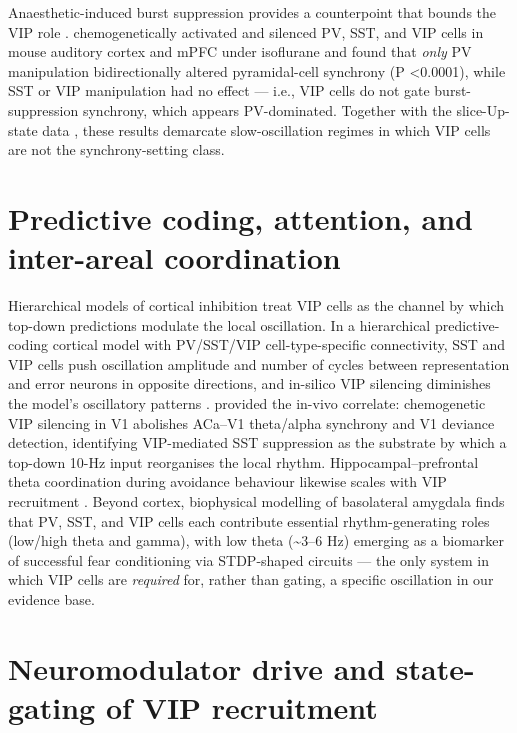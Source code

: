 \documentclass[11pt]{article}
\begin{document}
Anaesthetic-induced burst suppression provides a counterpoint that bounds the VIP role \citep{Yin2025, Veit2023}. \citet{Yin2025} chemogenetically activated and silenced PV, SST, and VIP cells in mouse auditory cortex and mPFC under isoflurane and found that \textit{only} PV manipulation bidirectionally altered pyramidal-cell synchrony (P \textless  0.0001), while SST or VIP manipulation had no effect --- i.e., VIP cells do not gate burst-suppression synchrony, which appears PV-dominated. Together with the slice-Up-state data \citep{Tahvildari2012}, these results demarcate slow-oscillation regimes in which VIP cells are not the synchrony-setting class.

\section{Predictive coding, attention, and inter-areal coordination}

Hierarchical models of cortical inhibition treat VIP cells as the channel by which top-down predictions modulate the local oscillation. In a hierarchical predictive-coding cortical model with PV/SST/VIP cell-type-specific connectivity, SST and VIP cells push oscillation amplitude and number of cycles between representation and error neurons in opposite directions, and in-silico VIP silencing diminishes the model's oscillatory patterns \citep{Lee2025}. \citet{Bastos2023a} provided the in-vivo correlate: chemogenetic VIP silencing in V1 abolishes ACa--V1 theta/alpha synchrony and V1 deviance detection, identifying VIP-mediated SST suppression as the substrate by which a top-down 10-Hz input reorganises the local rhythm. Hippocampal--prefrontal theta coordination during avoidance behaviour likewise scales with VIP recruitment \citep{Lee2019}. Beyond cortex, biophysical modelling of basolateral amygdala finds that PV, SST, and VIP cells each contribute essential rhythm-generating roles (low/high theta and gamma), with low theta ({\textasciitilde}3--6 Hz) emerging as a biomarker of successful fear conditioning via STDP-shaped circuits \citep{Cattani2024} --- the only system in which VIP cells are \textit{required} for, rather than gating, a specific oscillation in our evidence base.

\section{Neuromodulator drive and state-gating of VIP recruitment}
\end{document}
